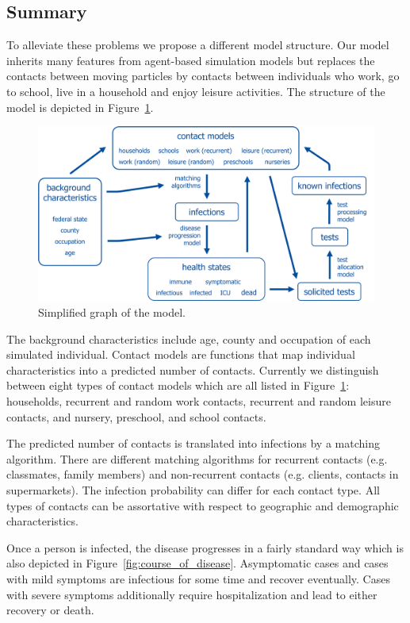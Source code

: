 \subsection{Summary}
\label{sub:model_summary}

To alleviate these problems we propose a different model structure. Our model inherits
many features from agent-based simulation models but replaces the contacts between
moving particles by contacts between individuals who work, go to school, live in a
household and enjoy leisure activities. The structure of the model is depicted in
Figure~\ref{fig:model_graph}.

\begin{figure}[!tp]
    \centering
    \includegraphics[width=\textwidth]{../figures/model_detailed.png}
    \caption{Simplified graph of the model.}
    \label{fig:model_graph}
\end{figure}

The background characteristics include age, county and occupation of each simulated
individual. Contact models are functions that map individual characteristics into a
predicted number of contacts. Currently we distinguish between eight types of contact
models which are all listed in Figure~\ref{fig:model_graph}: households, recurrent and
random work contacts, recurrent and random leisure contacts, and nursery, preschool, and
school contacts.

The predicted number of contacts is translated into infections by a matching algorithm.
There are different matching algorithms for recurrent contacts (e.g. classmates, family
members) and non-recurrent contacts (e.g. clients, contacts in supermarkets). The
infection probability can differ for each contact type. All types of contacts can be
assortative with respect to geographic and demographic characteristics.

Once a person is infected, the disease progresses in a fairly standard way which is also
depicted in Figure~\ref{fig:course_of_disease}. Asymptomatic cases and cases with mild
symptoms are infectious for some time and recover eventually. Cases with severe symptoms
additionally require hospitalization and lead to either recovery or death.

